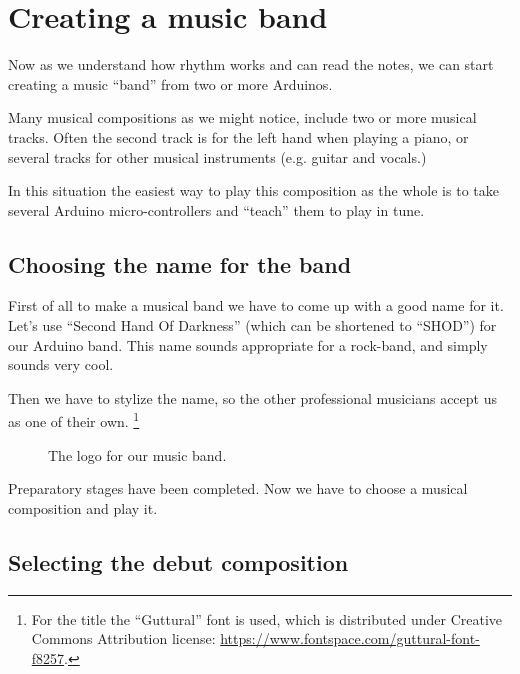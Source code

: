 \documentclass[../sparc.tex]{subfiles}
\begin{document}
\newpage
\section{Creating a music band}

Now as we understand how rhythm works and can read the notes, we can start
creating a music ``band'' from two or more Arduinos.

Many musical compositions as we might notice, include two or more musical
tracks.  Often the second track is for the left hand when playing a piano, or
several tracks for other musical instruments (e.g. guitar and vocals.)

In this situation the easiest way to play this composition as the whole is to
take several Arduino micro-controllers and ``teach'' them to play in tune.

\subsection{Choosing the name for the band}

First of all to make a musical band we have to come up with a good name for it.
Let's use ``Second Hand Of Darkness'' (which can be shortened to ``SHOD'') for
our Arduino band.  This name sounds appropriate for a rock-band, and simply
sounds very cool.

Then we have to stylize the name, so the other professional musicians accept us
as one of their own. \footnote{For the title the ``Guttural'' font is used,
which is distributed under Creative Commons Attribution license:
\url{https://www.fontspace.com/guttural-font-f8257}.}

\begin{figure}[ht]
  \centering
  
  \caption{The logo for our music band.}
  \label{fig:shod-band-logo}
\end{figure}

Preparatory stages have been completed.  Now we have to choose a musical
composition and play it.

\subsection{Selecting the debut composition}
\end{document}
